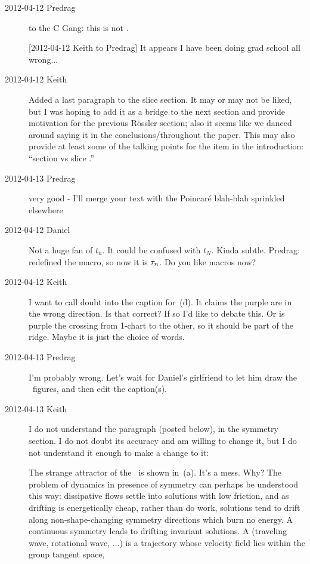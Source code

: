 \begin{description}
\item[2012-04-12 Predrag] to the C Gang: this is not
.

[2012-04-12 Keith to Predrag] It appears I have been doing grad school
all wrong...

\item[2012-04-12 Keith] Added a last paragraph to the slice section.  It
may or may not be liked, but I was hoping to add it as a bridge to the
next section and provide motivation for the previous R\"ossler section;
also it seems like we danced around saying it in the
conclusions/throughout the paper.  This may also provide at least some of
the talking points for the item in the introduction:
      ``section {\PoincS} vs slice \pSRed.''

\item[2012-04-13 Predrag] very  good - I'll merge your text with the
Poincar\'e blah-blah sprinkled elsewhere

\item[2012-04-12 Daniel] Not a huge fan of $t_n$. It could be confused with
    $t_N$. Kinda subtle. Predrag: redefined the macro, so now it is
    $\tau_n$. Do you like macros now?

\item[2012-04-12 Keith]
I want to call doubt into the caption for \,(d).  It
claims the purple are in the wrong direction.  Is that correct?  If so
I'd like to debate this. Or is purple the crossing from 1-chart to the
other, so it should be part of the ridge. Maybe it is just the choice of
words.

\item[2012-04-13 Predrag]
I'm probably wrong. Let's wait for Daniel's girlfriend to let him draw
the \cLe\ figures, and then edit the caption(s).

\item[2012-04-13 Keith] I do not understand the paragraph (posted below),
in the symmetry section.  I do not doubt its accuracy and am willing to
change it, but I do not understand it enough to make a change to it:

The strange attractor of the \cLf\ is shown in
\,(a). It's a mess. Why? The problem of dynamics
in presence of symmetry can perhaps be understood this way: dissipative
flows settle into solutions with low friction, and as drifting is
energetically cheap, rather than do work, solutions tend to drift along
non-shape-changing symmetry directions which burn no energy.
A continuous symmetry leads to drifting invariant solutions.
A {\em \reqv} (traveling wave, rotational wave, ...) is a trajectory
whose velocity field lies within the group tangent space,


\end{description}
